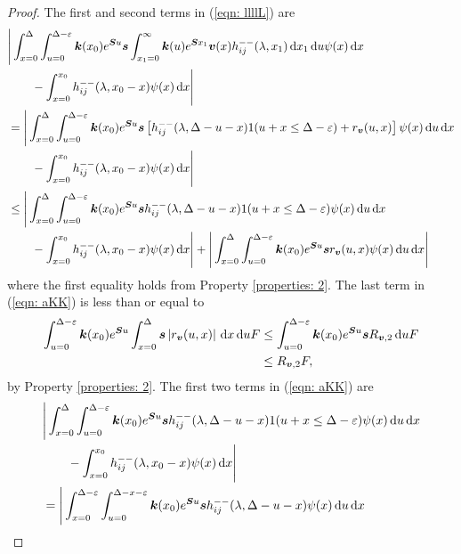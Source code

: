 \begin{proof}
	The first and second terms in (\ref{eqn: llllL}) are
	\begin{align}
		&\Bigg|\int_{x=0}^{\Delta}\int_{u=0}^{\Delta-\varepsilon} \boldsymbol k(x_0)e^{\boldsymbol Su}\boldsymbol s \int_{x_1=0}^\infty \boldsymbol k(u)  e^{\boldsymbol S x_1} {\boldsymbol v}(x) h_{ij}^{--}(\lambda, x_1) \, \mathrm{d} x_1 \, \mathrm{d} u \psi(x) \, \mathrm{d} x \nonumber
		\\&{}\qquad {} - \int_{x=0}^{x_0} h_{ij}^{--}(\lambda, x_0 - x)\psi(x)\, \mathrm{d} x\Bigg| \nonumber
		\\&=\Bigg|\int_{x=0}^{\Delta}\int_{u=0}^{\Delta-\varepsilon} \boldsymbol k(x_0)e^{\boldsymbol Su}\boldsymbol s \left[ h_{ij}^{--}(\lambda, \Delta - u - x)1(u+x\leq \Delta-\varepsilon) + r_{\boldsymbol v}(u,x) \right] \psi(x) \, \mathrm{d} u \, \mathrm{d} x \nonumber
		\\&{}\qquad {} - \int_{x=0}^{x_0} h_{ij}^{--}(\lambda, x_0 - x)\psi(x)\, \mathrm{d} x \Bigg|\nonumber
		\\&\leq \Bigg|\int_{x=0}^{\Delta}\int_{u=0}^{\Delta-\varepsilon} \boldsymbol k(x_0)e^{\boldsymbol Su}\boldsymbol s h_{ij}^{--}(\lambda, \Delta - u - x)1(u+x\leq \Delta-\varepsilon) \psi(x) \, \mathrm{d} u \, \mathrm{d} x \nonumber 
		\\&\qquad{} - \int_{x=0}^{x_0} h_{ij}^{--}(\lambda, x_0 - x)\psi(x)\, \mathrm{d} x \Bigg| + \Bigg| \int_{x=0}^{\Delta}\int_{u=0}^{\Delta-\varepsilon} \boldsymbol k(x_0)e^{\boldsymbol Su}\boldsymbol s r_{\boldsymbol v}(u,x) \psi(x) \, \mathrm{d} u \, \mathrm{d} x \Bigg|
		\label{eqn: aKK}
	\end{align}
	where the first equality holds from Property \ref{properties: 2}. The last term in (\ref{eqn: aKK}) is less than or equal to 
	\begin{align}
		\int_{u=0}^{\Delta-\varepsilon} \boldsymbol k(x_0)e^{\boldsymbol Su} \int_{x=0}^{\Delta} \boldsymbol s \left|r_{\boldsymbol v}(u,x)\right|\, \mathrm{d} x \, \mathrm{d} u F 
		&\leq \int_{u=0}^{\Delta-\varepsilon} \boldsymbol k(x_0)e^{\boldsymbol Su} \boldsymbol sR_{{\boldsymbol v},2} \, \mathrm{d} u F \nonumber 
		\\&\leq R_{{\boldsymbol v},2} F, \label{eqn: HhHj}
	\end{align}
	by Property \ref{properties: 2}. The first two terms in (\ref{eqn: aKK}) are 
	\begin{align}
		& \Bigg|\int_{x=0}^{\Delta}\int_{u=0}^{\Delta-\varepsilon} \bs k(x_0)e^{\bs Su}\bs s h_{ij}^{--}(\lambda, \Delta - u - x)1(u+x\leq \Delta-\varepsilon) \psi(x) \wrt u \wrt x \nonumber
		\\&\qquad{} - \int_{x=0}^{x_0} h_{ij}^{--}(\lambda, x_0 - x)\psi(x)\wrt x \Bigg| \nonumber 
		\\&= \Bigg|\int_{x=0}^{\Delta-\varepsilon}\int_{u=0}^{\Delta-x-\varepsilon} \bs k(x_0)e^{\bs Su}\bs s h_{ij}^{--}(\lambda, \Delta - u - x) \psi(x) \wrt u \wrt x \nonumber

\end{align}
\end{proof}
